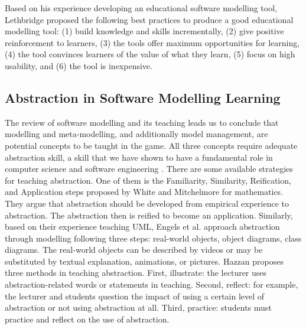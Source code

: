 \documentclass[12pt, a4paper]{report}
\begin{document}
{Based on his experience developing an educational software modelling tool, Lethbridge \cite{lethbridge2014teaching} proposed the following best practices to produce a good educational modelling tool: (1) build knowledge and skills incrementally, (2) give positive reinforcement to learners, (3) the tools offer maximum opportunities for learning, (4) the tool convinces learners of the value of what they learn, (5) focus on high usability, and (6) the tool is inexpensive.

\subsection{Abstraction in Software Modelling Learning}
\label{Abstraction in Software Modelling Learning}
The review of software modelling and its teaching leads us to conclude that modelling and meta-modelling, and additionally model management, are potential concepts to be taught in the game. All three concepts require adequate abstraction skill, a skill that we have shown to have a fundamental role in computer science and software engineering \cite{engels2005teaching, Kramer2007, hazzan2008reflections}. There are some available strategies for teaching abstraction. One of them is the Familiarity, Similarity, Reification, and Application steps proposed by White and Mitchelmore \cite{white2010teaching} for mathematics. They argue that abstraction should be developed from empirical experience to abstraction. The abstraction then is reified to become an application. Similarly, based on their experience teaching UML, Engels et al. \cite{engels2005teaching} approach abstraction through modelling following three steps: real-world objects, object diagrams, class diagrams. The real-world objects can be described by videos or may be substituted by textual explanation, animations, or pictures. Hazzan \cite{hazzan2008reflections} proposes three methods in teaching abstraction. First, illustrate: the lecturer uses abstraction-related words or statements in teaching. Second, reflect: for example, the lecturer and students question the impact of using a certain level of abstraction or not using abstraction at all. Third, practice: students must practice and reflect on the use of abstraction. 

}
\end{document}
